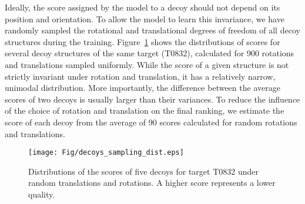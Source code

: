 Ideally, the score assigned by the model to a decoy should not depend
on its position and orientation.  To allow the model to learn this
invariance, we have randomly sampled the rotational and translational
degrees of freedom of all decoy structures during the training.
%
Figure~\ref{Fig:DecoysScoreDistribution} shows the distributions of
scores for several decoy structures of the same target (T0832),
calculated for 900 rotations and translations sampled uniformly.
While the score of a given structure is not strictly invariant under
rotation and translation, it has a relatively narrow, unimodal
distribution.
More importantly, the difference between the average scores of two
decoys is usually larger than their variances. To reduce the influence
of the choice of rotation and translation on the final ranking, we
estimate the score of each decoy from the average of 90 scores
calculated for random rotations and translations.






\begin{figure}[H]
    \centering
    \texttt{[image: Fig/decoys\_sampling\_dist.eps]}
%
    \caption{Distributions of the scores of five decoys for target
    T0832 under random translations and rotations. A higher score
    represents a lower quality.}
%
    \label{Fig:DecoysScoreDistribution}
\end{figure}

